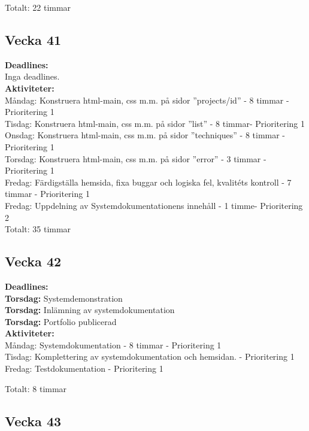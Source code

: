 \documentclass{TDP003mall}
\begin{document}
Totalt: 22 timmar

\subsection{Vecka 41}
\textbf{Deadlines:}\\
Inga deadlines.\\

\textbf{Aktiviteter:} \\
Måndag: Konstruera html-main, css m.m. på sidor ''projects/id'' - 8 timmar - Prioritering 1\\
Tisdag: Konstruera html-main, css m.m. på sidor ''list'' - 8 timmar- Prioritering 1\\
Onsdag: Konstruera html-main, css m.m. på sidor ''techniques'' - 8 timmar - Prioritering 1 \\
Torsdag: Konstruera html-main, css m.m. på sidor ''error'' - 3 timmar - Prioritering 1\\
Fredag: Färdigställa hemsida, fixa buggar och logiska fel, kvalitéts kontroll - 7 timmar - Prioritering 1\\
Fredag: Uppdelning av Systemdokumentationens innehåll - 1 timme- Prioritering 2\\

Totalt: 35 timmar

\subsection{Vecka 42}

\textbf{Deadlines:} \\
\textbf{{\color{red}Torsdag:}} Systemdemonstration\\
\textbf{{\color{red}Torsdag:}} Inlämning av systemdokumentation\\
\textbf{{\color{red}Torsdag:}} Portfolio publicerad\\

\textbf{Aktiviteter:} \\
Måndag: Systemdokumentation - 8 timmar - Prioritering 1\\
Tisdag: Komplettering av systemdokumentation och hemsidan. - Prioritering 1\\
Fredag: Testdokumentation - Prioritering 1

Totalt: 8 timmar

\subsection{Vecka 43}
\end{document}
